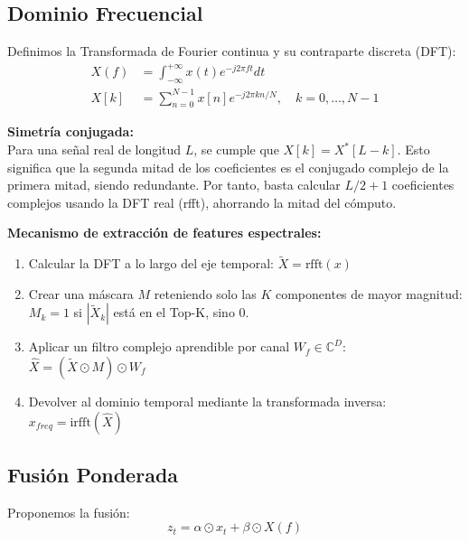 \documentclass[12pt,a4paper]{article}
\begin{document}
\subsection{Dominio Frecuencial}

Definimos la Transformada de Fourier continua y su contraparte discreta (DFT):
\begin{align}
X(f) &= \int_{-\infty}^{+\infty} x(t) e^{-j 2\pi ft} dt \\
X[k] &= \sum_{n=0}^{N-1} x[n] e^{-j 2\pi kn/N}, \quad k = 0, \dots, N-1
\end{align}

\textbf{Simetría conjugada:}\\
Para una señal real de longitud $L$, se cumple que $X[k] = X^*[L-k]$. Esto significa que la segunda mitad de los coeficientes es el conjugado complejo de la primera mitad, siendo redundante. Por tanto, basta calcular $L/2+1$ coeficientes complejos usando la DFT real (rfft), ahorrando la mitad del cómputo.

\textbf{Mecanismo de extracción de features espectrales:}
\begin{enumerate}
    \item[(a)] Calcular la DFT a lo largo del eje temporal: $\tilde{X} = \text{rfft}(x)$     \item[(b)] Crear una máscara $M$ reteniendo solo las $K$ componentes de mayor magnitud: $M_k = 1$ si $|\tilde{X}_k|$ está en el Top-K, sino $0$.
    \item[(c)] Aplicar un filtro complejo aprendible por canal $W_f \in \mathbb{C}^D$: $\hat{X} = (\tilde{X} \odot M) \odot W_f$     \item[(d)] Devolver al dominio temporal mediante la transformada inversa: $x_{freq} = \text{irfft}(\hat{X})$ \end{enumerate}

\subsection{Fusión Ponderada}

Proponemos la fusión:
\begin{equation}
z_t = \alpha \odot x_t + \beta \odot X(f)
\end{equation}
\end{document}

